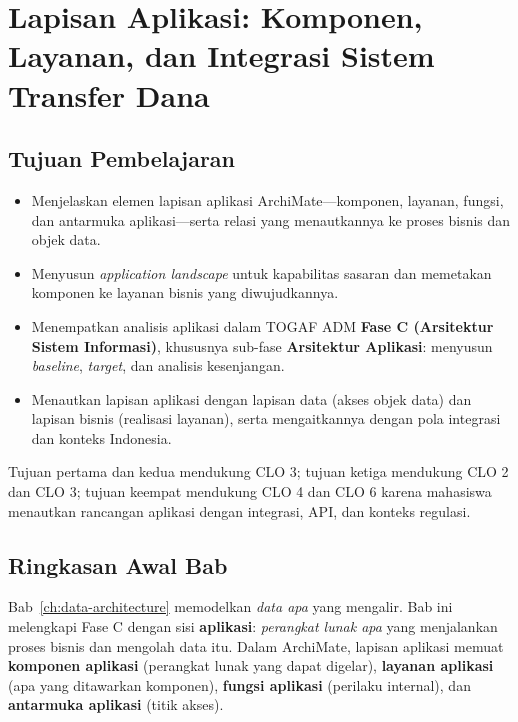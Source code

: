 \chapter[Lapisan Aplikasi: Komponen, Layanan, dan Integrasi]{Lapisan Aplikasi:
Komponen, Layanan, dan Integrasi Sistem Transfer Dana}
\label{ch:application-architecture}
\setlength{\emergencystretch}{2em}

\section*{Tujuan Pembelajaran}
\begin{itemize}
  \item Menjelaskan elemen lapisan aplikasi ArchiMate---komponen, layanan,
        fungsi, dan antarmuka aplikasi---serta relasi yang menautkannya ke
        proses bisnis dan objek data.
  \item Menyusun \emph{application landscape} untuk kapabilitas sasaran dan
        memetakan komponen ke layanan bisnis yang diwujudkannya.
  \item Menempatkan analisis aplikasi dalam TOGAF ADM \textbf{Fase C (Arsitektur
        Sistem Informasi)}, khususnya sub-fase \textbf{Arsitektur Aplikasi}:
        menyusun \emph{baseline}, \emph{target}, dan analisis kesenjangan.
  \item Menautkan lapisan aplikasi dengan lapisan data (akses objek data) dan
        lapisan bisnis (realisasi layanan), serta mengaitkannya dengan pola
        integrasi dan konteks Indonesia.
\end{itemize}

Tujuan pertama dan kedua mendukung CLO 3; tujuan ketiga mendukung CLO 2 dan
CLO 3; tujuan keempat mendukung CLO 4 dan CLO 6 karena mahasiswa menautkan
rancangan aplikasi dengan integrasi, API, dan konteks regulasi.

\section{Ringkasan Awal Bab}

Bab~\ref{ch:data-architecture} memodelkan \emph{data apa} yang mengalir. Bab ini
melengkapi Fase C dengan sisi \textbf{aplikasi}: \emph{perangkat lunak apa} yang
menjalankan proses bisnis dan mengolah data itu. Dalam ArchiMate, lapisan
aplikasi memuat \textbf{komponen aplikasi} (perangkat lunak yang dapat digelar),
\textbf{layanan aplikasi} (apa yang ditawarkan komponen), \textbf{fungsi
aplikasi} (perilaku internal), dan \textbf{antarmuka aplikasi} (titik akses).

